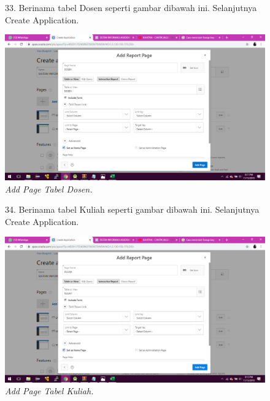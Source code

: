 \begin{enumerate}
\begin{figure}
\item[33.] Berinama tabel Dosen seperti gambar dibawah ini. Selanjutnya Create Application.    
    \begin{center}
    \includegraphics[scale=0.3]{figures/61.png}
    \caption{\textit{Add Page Tabel Dosen.}}
    \end{center}
    \label{gambar}
    \end{figure} 

\begin{figure}
\item[34.] Berinama tabel Kuliah seperti gambar dibawah ini. Selanjutnya Create Application.    
    \begin{center}
    \includegraphics[scale=0.3]{figures/62.png}
    \caption{\textit{Add Page Tabel Kuliah.}}
    \end{center}
    \label{gambar}
    \end{figure}    


\end{enumerate}
